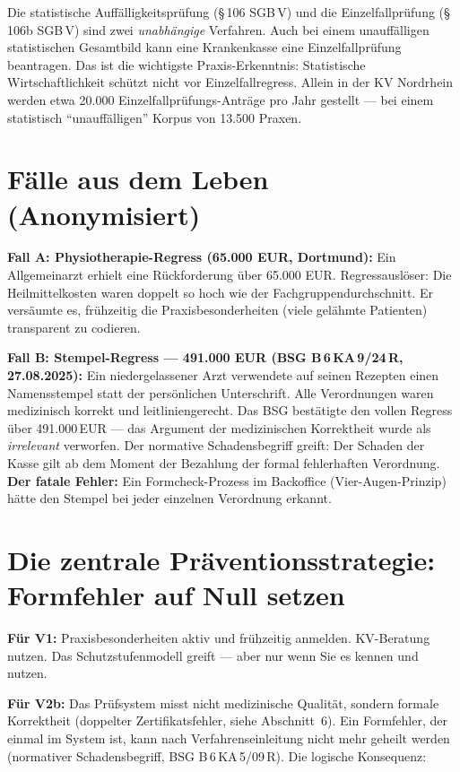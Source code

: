 \documentclass[a4paper]{umbruch-position}
\begin{document}
Die statistische Auff\"alligkeitspr\"ufung (\S\,106 SGB\,V) und die Einzelfallpr\"ufung (\S\,106b SGB\,V) sind zwei \textit{unabh\"angige} Verfahren. Auch bei einem unauff\"alligen statistischen Gesamtbild kann eine Krankenkasse eine Einzelfallpr\"ufung beantragen. Das ist die wichtigste Praxis-Erkenntnis: Statistische Wirtschaftlichkeit sch\"utzt nicht vor Einzelfallregress. Allein in der KV Nordrhein werden etwa 20.000 Einzelfallpr\"ufungs-Antr\"age pro Jahr gestellt --- bei einem statistisch ``unauff\"alligen'' Korpus von 13.500 Praxen.

\section{F\"alle aus dem Leben (Anonymisiert)}

\textbf{Fall A: Physiotherapie-Regress (65.000 EUR, Dortmund):}
Ein Allgemeinarzt erhielt eine R\"uckforderung \"uber 65.000 EUR. Regressausl\"oser: Die Heilmittelkosten waren doppelt so hoch wie der Fachgruppendurchschnitt. Er vers\"aumte es, fr\"uhzeitig die \glqq{}Praxisbesonderheiten\grqq{} (viele gel\"ahmte Patienten) transparent zu codieren. 

\textbf{Fall B: Stempel-Regress --- 491.000 EUR (BSG B\,6\,KA\,9/24\,R, 27.08.2025):}
Ein niedergelassener Arzt verwendete auf seinen Rezepten einen Namensstempel statt der pers\"onlichen Unterschrift. Alle Verordnungen waren medizinisch korrekt und leitliniengerecht. Das BSG best\"atigte den vollen Regress \"uber 491.000\,EUR --- das Argument der medizinischen Korrektheit wurde als \textit{irrelevant} verworfen. Der normative Schadensbegriff greift: Der Schaden der Kasse gilt ab dem Moment der Bezahlung der formal fehlerhaften Verordnung. \textbf{Der fatale Fehler:} Ein Formcheck-Prozess im Backoffice (Vier-Augen-Prinzip) h\"atte den Stempel bei jeder einzelnen Verordnung erkannt.

\newpage
\section{Die zentrale Pr\"aventionsstrategie: Formfehler auf Null setzen}

\textbf{F\"ur V1:} Praxisbesonderheiten aktiv und fr\"uhzeitig anmelden. KV-Beratung nutzen. Das Schutzstufenmodell greift --- aber nur wenn Sie es kennen und nutzen.

\textbf{F\"ur V2b:} Das Pr\"ufsystem misst nicht medizinische Qualit\"at, sondern formale Korrektheit (doppelter Zertifikatsfehler, siehe Abschnitt~6). Ein Formfehler, der einmal im System ist, kann nach Verfahrenseinleitung nicht mehr geheilt werden (normativer Schadensbegriff, BSG B\,6\,KA\,5/09\,R). Die logische Konsequenz:
\end{document}
